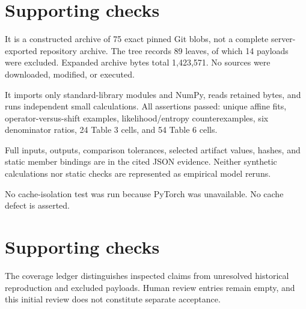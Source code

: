 \documentclass[10pt]{article}
\begin{document}
\section*{Supporting checks}
It is a constructed archive of 75 exact pinned Git blobs, not a complete server-exported repository archive. The tree records 89 leaves, of which 14 payloads were excluded. Expanded archive bytes total 1,423,571. No sources were downloaded, modified, or executed.\par
It imports only standard-library modules and NumPy, reads retained bytes, and runs independent small calculations. All assertions passed: unique affine fits, operator-versus-shift examples, likelihood/entropy counterexamples, six denominator ratios, 24 Table 3 cells, and 54 Table 6 cells.\par
Full inputs, outputs, comparison tolerances, selected artifact values, hashes, and static member bindings are in the cited JSON evidence. Neither synthetic calculations nor static checks are represented as empirical model reruns.\par
No cache-isolation test was run because PyTorch was unavailable. No cache defect is asserted.\par
\section*{Supporting checks}
The coverage ledger distinguishes inspected claims from unresolved historical reproduction and excluded payloads. Human review entries remain empty, and this initial review does not constitute separate acceptance.\par
\end{document}
